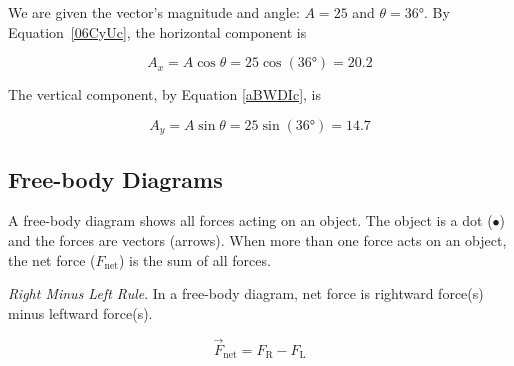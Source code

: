 \documentclass[main.tex]{subfiles}
\begin{document}
\Solution We are given the vector's magnitude and angle: $A = 25$ and $\theta=\ang{36}$. By Equation~\eqref{06CyUc}, the horizontal component is

\begin{equation*}
    A_x = A \cos{\theta} = 25 \cos{(\ang{36})} = 20.2
\end{equation*}

The vertical component, by Equation \eqref{aBWDIc}, is

\begin{equation*}
    A_y = A \sin{\theta} = 25 \sin{(\ang{36})} = 14.7
\end{equation*}

\solutionEnd

\subsection{Free-body Diagrams} \label{SdNOfY}

A \gls{free-body diagram} shows all forces acting on an object. The object is a dot ($\bullet$) and the forces are vectors (arrows). When more than one force acts on an object, the \gls{net force} ($F_{\text{net}}$) is the sum of all forces. 

\begin{mdframed}[backgroundcolor=black!10]
\textit{Right Minus Left Rule}. In a free-body diagram, net force is rightward force(s) minus leftward force(s).

\begin{center}
\end{center}
\vspace{-1em}

\begin{equation}
    \vec{F}_{\text{net}} = F_{\text{R}} - F_{\text{L}}
\end{equation}
\end{mdframed}
\end{document}
